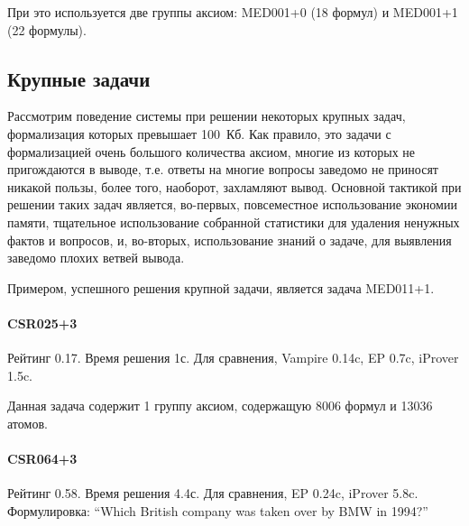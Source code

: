 При это используется две группы аксиом: MED001+0 (18 формул) и MED001+1 (22 формулы).







\subsection{Крупные задачи}
Рассмотрим поведение системы при решении некоторых крупных задач, формализация которых превышает 100~Кб. Как правило, это задачи с формализацией очень большого количества аксиом, многие из которых не пригождаются в выводе, т.е. ответы на многие вопросы заведомо не приносят никакой пользы, более того, наоборот, захламляют вывод. Основной тактикой при решении таких задач является, во-первых, повсеместное использование экономии памяти, тщательное использование собранной статистики для удаления ненужных фактов и вопросов, и, во-вторых, использование знаний о задаче, для выявления заведомо плохих ветвей вывода.

Примером, успешного решения крупной задачи, является задача MED011+1.

\paragraph{CSR025+3}
Рейтинг 0.17. Время решения 1с. Для сравнения, Vampire 0.14c, EP 0.7c, iProver 1.5c.

Данная задача содержит 1 группу аксиом, содержащую 8006 формул и 13036 атомов.

\paragraph{CSR064+3}
Рейтинг 0.58. Время решения 4.4с. Для сравнения, EP 0.24c, iProver 5.8c.
Формулировка: ``Which British company was taken over by BMW in 1994?''

